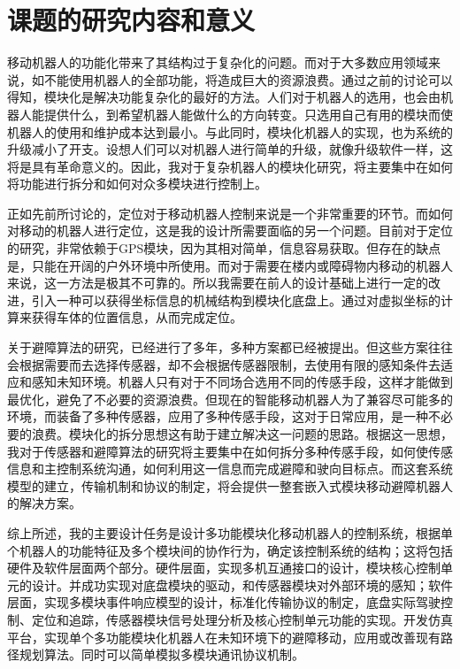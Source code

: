 \section{课题的研究内容和意义}
移动机器人的功能化带来了其结构过于复杂化的问题。而对于大多数应用领域来说，如不能使用机器人的全部功能，将造成巨大的资源浪费。通过之前的讨论可以得知，模块化是解决功能复杂化的最好的方法。人们对于机器人的选用，也会由机器人能提供什么，到希望机器人能做什么的方向转变。只选用自己有用的模块而使机器人的使用和维护成本达到最小。与此同时，模块化机器人的实现，也为系统的升级减小了开支。设想人们可以对机器人进行简单的升级，就像升级软件一样，这将是具有革命意义的。因此，我对于复杂机器人的模块化研究，将主要集中在如何将功能进行拆分和如何对众多模块进行控制上。

正如先前所讨论的，定位对于移动机器人控制来说是一个非常重要的环节。而如何对移动的机器人进行定位，这是我的设计所需要面临的另一个问题。目前对于定位的研究，非常依赖于GPS模块，因为其相对简单，信息容易获取。但存在的缺点是，只能在开阔的户外环境中所使用。而对于需要在楼内或障碍物内移动的机器人来说，这一方法是极其不可靠的。所以我需要在前人的设计基础上进行一定的改进，引入一种可以获得坐标信息的机械结构到模块化底盘上。通过对虚拟坐标的计算来获得车体的位置信息，从而完成定位。

关于避障算法的研究，已经进行了多年，多种方案都已经被提出。但这些方案往往会根据需要而去选择传感器，却不会根据传感器限制，去使用有限的感知条件去适应和感知未知环境。机器人只有对于不同场合选用不同的传感手段，这样才能做到最优化，避免了不必要的资源浪费。但现在的智能移动机器人为了兼容尽可能多的环境，而装备了多种传感器，应用了多种传感手段，这对于日常应用，是一种不必要的浪费。模块化的拆分思想这有助于建立解决这一问题的思路。根据这一思想，我对于传感器和避障算法的研究将主要集中在如何拆分多种传感手段，如何使传感信息和主控制系统沟通，如何利用这一信息而完成避障和驶向目标点。而这套系统模型的建立，传输机制和协议的制定，将会提供一整套嵌入式模块移动避障机器人的解决方案。

综上所述，我的主要设计任务是设计多功能模块化移动机器人的控制系统，根据单个机器人的功能特征及多个模块间的协作行为，确定该控制系统的结构；这将包括硬件及软件层面两个部分。硬件层面，实现多机互通接口的设计，模块核心控制单元的设计。并成功实现对底盘模块的驱动，和传感器模块对外部环境的感知；软件层面，实现多模块事件响应模型的设计，标准化传输协议的制定，底盘实际驾驶控制、定位和追踪，传感器模块信号处理分析及核心控制单元功能的实现。开发仿真平台，实现单个多功能模块化机器人在未知环境下的避障移动，应用或改善现有路径规划算法。同时可以简单模拟多模块通讯协议机制。 


